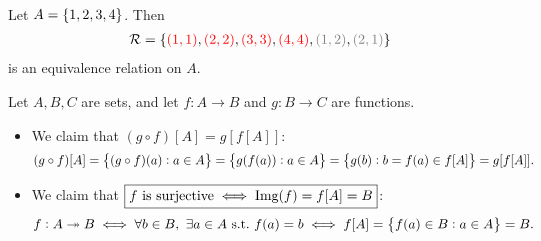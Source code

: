 \documentclass[11pt,openany]{article}
\begin{document}
\newpage
{}
\begin{remark*}
	\ \begin{figure}[h!]\centering
	\end{figure}
\end{remark*}
\vfill
\begin{example*}
	Let $A=\set{1,2,3,4}$. Then \begin{align*}
		\mathcal{R}=\{\textcolor{red}{(1,1)},\textcolor{red}{(2,2)},\textcolor{red}{(3,3)},\textcolor{red}{(4,4)},\textcolor{gray}{(1,2)},\textcolor{gray}{(2,1)}\}
	\end{align*} is an equivalence relation on $A$.
%		
\end{example*}
\vfill
\begin{note}
	Let $A,B,C$ are sets, and let $f:A\to B$ and $g:B\to C$ are functions.
	\begin{itemize}
		\item We claim that $\boxed{(g\circ f)[A]=g[f[A]]}$:\[
		(g\circ f)[A]=\set{(g\circ f)(a):a\in A}=\set{g(f(a)):a\in A}=\set{g(b):b=f(a)\in f[A]}=g[f[A]].
		\]
		\item We claim that $\boxed{f\ \text{is surjective}\iff \text{Img}(f)=f[A]=B}$: \[
		f:A\twoheadrightarrow B\iff \forall b\in B,\ \exists a\in A\ \text{s.t.}\ f(a)=b\iff f[A]=\set{f(a)\in B:a\in A}=B.
		\]
	\end{itemize} 
\end{note}
\end{document}
